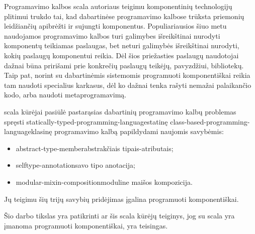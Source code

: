 Programavimo kalbos \gls{scala}{} autoriaus  teigimu komponentinių technologijų plitimui trukdo
tai, kad dabartinėse programavimo kalbose trūksta priemonių leidžiančių
apibrėžti ir sujungti komponentus\cite{odersky:scala-experiment}.
Populiariausios šiuo metu naudojamos programavimo kalbos turi galimybes
išreikštinai nurodyti komponentų teikiamas paslaugas, bet neturi
galimybės išreikštinai nurodyti, kokių paslaugų
komponentui reikia. Dėl šios priežasties paslaugų naudotojai dažnai
būna pririšami prie konkrečių paslaugų teikėjų, pavyzdžiui,
bibliotekų\cite{scalable-component-abstractions}. Taip pat, norint
su dabartinėmis sistemomis programuoti komponentiškai reikia
tam naudoti specialius karkasus, dėl ko dažnai tenka rašyti
nemažai palaikančio  kodo, arba naudoti
metaprogramavimą\cite{extensible-software-components}.

\gls{scala}{} kūrėjai pasiūlė pastarąsias
dabartinių programavimo kalbų problemas spręsti
\gls{statically-typed-programming-language}{statinę}
\gls{class-based-programming-language}{klasinę}
 programavimo kalbą papildydami naujomis
savybėmis\cite{scalable-component-abstractions}:
\begin{itemize}
  \item \gls{abstract-type-member}{abstrakčiais tipais-atributais};
  \item \gls{selftype-annotation}{savo tipo anotacija};
  \item \gls{modular-mixin-composition}{moduline maišos kompozicija}.
\end{itemize}
Jų teigimu\cite[1]{scalable-component-abstractions} šių trijų savybių
pridėjimas įgalina programuoti komponentiškai.

Šio darbo tikslas yra patikrinti ar šis \gls{scala}{}
kūrėjų teiginys, jog su \gls{scala}{} yra įmanoma
programuoti komponentiškai, yra teisingas.

